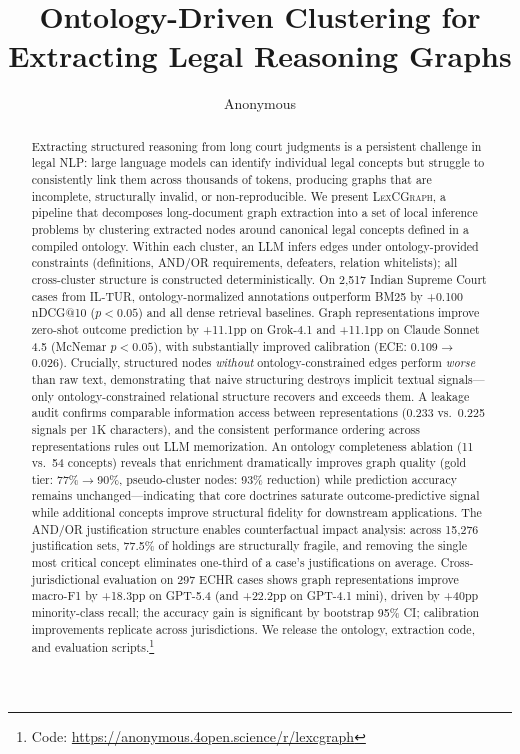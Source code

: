 \documentclass[11pt]{article}
\title{Ontology-Driven Clustering for Extracting Legal Reasoning Graphs}
\author{Anonymous}
\begin{document}
\maketitle

\begin{abstract}
Extracting structured reasoning from long court judgments is a persistent challenge in legal NLP: large language models can identify individual legal concepts but struggle to consistently link them across thousands of tokens, producing graphs that are incomplete, structurally invalid, or non-reproducible. We present \textsc{LexCGraph}, a pipeline that decomposes long-document graph extraction into a set of local inference problems by clustering extracted nodes around canonical legal concepts defined in a compiled ontology. Within each cluster, an LLM infers edges under ontology-provided constraints (definitions, AND/OR requirements, defeaters, relation whitelists); all cross-cluster structure is constructed deterministically. On 2,517 Indian Supreme Court cases from IL-TUR, ontology-normalized annotations outperform BM25 by +0.100 nDCG@10 ($p < 0.05$) and all dense retrieval baselines. Graph representations improve zero-shot outcome prediction by +11.1pp on Grok-4.1 and +11.1pp on Claude Sonnet 4.5 (McNemar $p < 0.05$), with substantially improved calibration (ECE: 0.109$\rightarrow$0.026). Crucially, structured nodes \emph{without} ontology-constrained edges perform \emph{worse} than raw text, demonstrating that naive structuring destroys implicit textual signals---only ontology-constrained relational structure recovers and exceeds them. A leakage audit confirms comparable information access between representations (0.233 vs.\ 0.225 signals per 1K characters), and the consistent performance ordering across representations rules out LLM memorization. An ontology completeness ablation (11 vs.\ 54 concepts) reveals that enrichment dramatically improves graph quality (gold tier: 77\%$\rightarrow$90\%, pseudo-cluster nodes: 93\% reduction) while prediction accuracy remains unchanged---indicating that core doctrines saturate outcome-predictive signal while additional concepts improve structural fidelity for downstream applications. The AND/OR justification structure enables counterfactual impact analysis: across 15,276 justification sets, 77.5\% of holdings are structurally fragile, and removing the single most critical concept eliminates one-third of a case's justifications on average. Cross-jurisdictional evaluation on 297 ECHR cases shows graph representations improve macro-F1 by +18.3pp on GPT-5.4 (and +22.2pp on GPT-4.1 mini), driven by +40pp minority-class recall; the accuracy gain is significant by bootstrap 95\% CI; calibration improvements replicate across jurisdictions. We release the ontology, extraction code, and evaluation scripts.\footnote{Code: \url{https://anonymous.4open.science/r/lexcgraph}}
\end{abstract}
\end{document}

